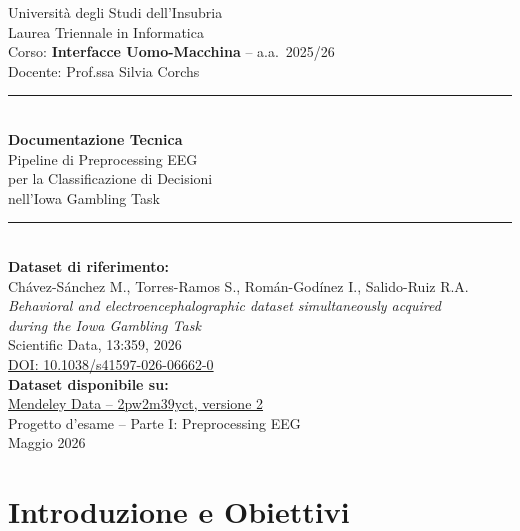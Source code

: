 \documentclass[12pt, a4paper]{article}
\begin{document}
\begin{titlepage}
\centering
\vspace*{1cm}
{\large Università degli Studi dell'Insubria\\
Laurea Triennale in Informatica}\\[0.5cm]
{\large Corso: \textbf{Interfacce Uomo-Macchina} -- a.a.\ 2025/26}\\[0.3cm]
{\small Docente: Prof.ssa Silvia Corchs}\\[2cm]

\rule{\textwidth}{1.5pt}\\[0.4cm]
{\LARGE \textbf{Documentazione Tecnica}}\\[0.3cm]
{\Large Pipeline di Preprocessing EEG}\\[0.2cm]
{\large per la Classificazione di Decisioni\\
nell'Iowa Gambling Task}\\[0.4cm]
\rule{\textwidth}{1.5pt}\\[2cm]

{\large \textbf{Dataset di riferimento:}}\\[0.2cm]
Chávez-Sánchez M., Torres-Ramos S., Román-Godínez I., Salido-Ruiz R.A.\\
\textit{Behavioral and electroencephalographic dataset simultaneously acquired\\
during the Iowa Gambling Task}\\
Scientific Data, 13:359, 2026\\
\href{https://doi.org/10.1038/s41597-026-06662-0}{DOI: 10.1038/s41597-026-06662-0}\\[1.5cm]

{\large \textbf{Dataset disponibile su:}}\\
\href{https://data.mendeley.com/datasets/2pw2m39yct/2}{Mendeley Data -- 2pw2m39yct, versione 2}\\[2cm]

\vfill
{\large Progetto d'esame -- Parte I: Preprocessing EEG}\\[0.3cm]
{\large Maggio 2026}
\end{titlepage}

\tableofcontents
\newpage

\section{Introduzione e Obiettivi}
\end{document}
